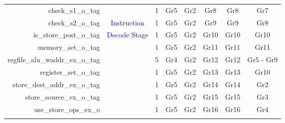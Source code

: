 \begin{table}[t]
\begin{tabular}{@{}rccccccc@{}}
        check\_s1\_o\_tag               &                                       & 1      & Gr5                         & Gr2                         & Gr8                         & Gr8                         & Gr7                                        \\
        check\_s2\_o\_tag               & \textcolor{blue}{Instruction}         & 1      & Gr5                         & Gr2                         & Gr9                         & Gr9                         & Gr8                                        \\
        is\_store\_post\_o\_tag         & \textcolor{blue}{Decode Stage}        & 1      & Gr5                         & Gr2                         & Gr10                        & Gr10                        & Gr10                                       \\
        memory\_set\_o\_tag             &                                       & 1      & Gr5                         & Gr2                         & Gr11                        & Gr11                        & Gr11                                       \\
        regfile\_alu\_waddr\_ex\_o\_tag &                                       & 5      & Gr4                         & Gr2                         & Gr12                        & Gr12                        & Gr5 - Gr9                                  \\
        register\_set\_o\_tag           &                                       & 1      & Gr5                         & Gr2                         & Gr13                        & Gr13                        & Gr10                                       \\
        store\_dest\_addr\_ex\_o\_tag   &                                       & 1      & Gr5                         & Gr2                         & Gr14                        & Gr14                        & Gr2                                        \\
        store\_source\_ex\_o\_tag       &                                       & 1      & Gr5                         & Gr2                         & Gr15                        & Gr15                        & Gr3                                        \\
        use\_store\_ops\_ex\_o          &                                       & 1      & Gr5                         & Gr2                         & Gr16                        & Gr16                        & Gr4                                        \\\hdashline

\end{tabular}
\end{table}
